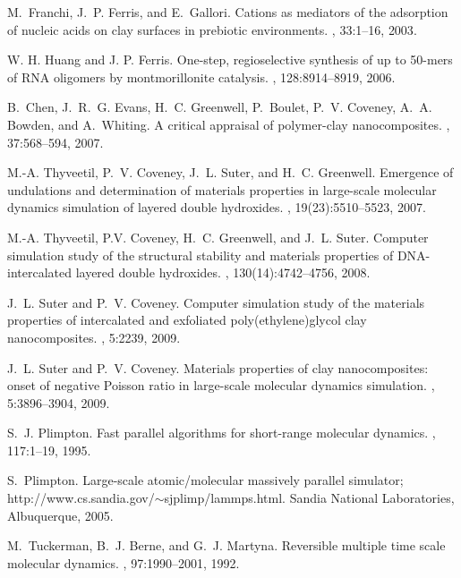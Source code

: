 \begin{thebibliography}{10}
M.~Franchi, J.~P. Ferris, and E.~Gallori.
\newblock Cations as mediators of the adsorption of nucleic acids on clay
  surfaces in prebiotic environments.
, {33}:{1--16},
  {2003}.

W. H. Huang and J. P. Ferris.
\newblock One-step, regioselective synthesis of up to 50-mers of {RNA}
  oligomers by montmorillonite catalysis.
, {128}:{8914--8919},
  {2006}.

B.~Chen, J.~R.~G. Evans, H.~C. Greenwell, P.~Boulet, P.~V. Coveney, A.~A.
  Bowden, and A.~Whiting.
\newblock A critical appraisal of polymer-clay nanocomposites.
, 37:568--594, 2007.

M.-A. Thyveetil, P.~V. Coveney, J.~L. Suter, and H.~C. Greenwell.
\newblock Emergence of undulations and determination of materials properties in
  large-scale molecular dynamics simulation of layered double hydroxides.
, 19(23):5510--5523, 2007.

M.-A. Thyveetil, P.V. Coveney, H.~C. Greenwell, and J.~L. Suter.
\newblock Computer simulation study of the structural stability and materials
  properties of {DNA}-intercalated layered double hydroxides.
, 130(14):4742--4756, 2008.

J.~L. Suter and P.~V. Coveney.
\newblock Computer simulation study of the materials properties of intercalated
  and exfoliated poly(ethylene)glycol clay nanocomposites.
, 5:2239, 2009.

J.~L. Suter and P.~V. Coveney.
\newblock Materials properties of clay nanocomposites: onset of negative
  {Poisson} ratio in large-scale molecular dynamics simulation.
, 5:3896--3904, 2009.

S.~J. Plimpton.
\newblock Fast parallel algorithms for short-range molecular dynamics.
, 117:1--19, 1995.

S.~Plimpton.
\newblock Large-scale atomic/molecular massively parallel simulator;
  http://www.cs.sandia.gov/$\sim$sjplimp/lammps.html.
\newblock Sandia National Laboratories, Albuquerque, 2005.

M.~Tuckerman, B.~J. Berne, and G.~J. Martyna.
\newblock Reversible multiple time scale molecular dynamics.
, 97:1990--2001, 1992.


\end{thebibliography}
